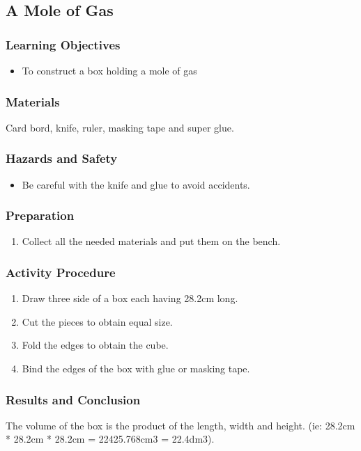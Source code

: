 \subsection{A Mole of Gas}

\subsubsection*{Learning Objectives}
\begin{itemize}
\item{To construct a box holding a mole of gas}
\end{itemize}

\subsubsection*{Materials}
Card bord, knife, ruler, masking tape and super glue.

\subsubsection*{Hazards and Safety}
\begin{itemize}
\item{Be careful with the knife and glue to avoid accidents.}
\end{itemize}

\subsubsection*{Preparation}
\begin{enumerate}
\item{Collect all the needed materials and put them on the bench.}
\end{enumerate}

\subsubsection*{Activity Procedure}
\begin{enumerate}
\item{Draw three side of a box each having 28.2cm long.}
\item{Cut the pieces to obtain equal size.}
\item{Fold the edges to obtain the cube.}
\item{Bind the edges of the box with glue or masking tape.}
\end{enumerate}

\subsubsection*{Results and Conclusion}
The volume of the box is the product of the length, width and height. (ie: 28.2cm * 28.2cm * 28.2cm = 22425.768cm3 = 22.4dm3).

